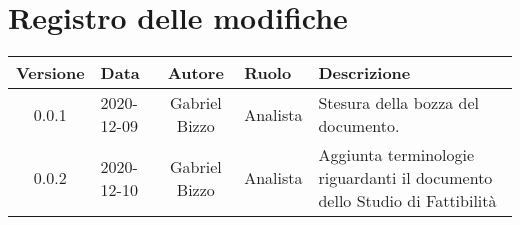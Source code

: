 \section*{Registro delle modifiche}
\setcounter{table}{-1}
{


\centering
\renewcommand{\arraystretch}{1.5}
\begin{longtable}{c C{3.5cm} c C{3.5cm} C{3.5cm}}
\textbf{Versione} &
\textbf{Data}&
\textbf{Autore}&
\textbf{Ruolo}&
\textbf{Descrizione}\\
\endhead

0.0.1 & 2020-12-09 & Gabriel Bizzo & Analista & Stesura della bozza del documento. \\
0.0.2 & 2020-12-10 & Gabriel Bizzo & Analista & Aggiunta terminologie riguardanti il documento dello Studio di Fattibilità \\
		
\end{longtable}
}